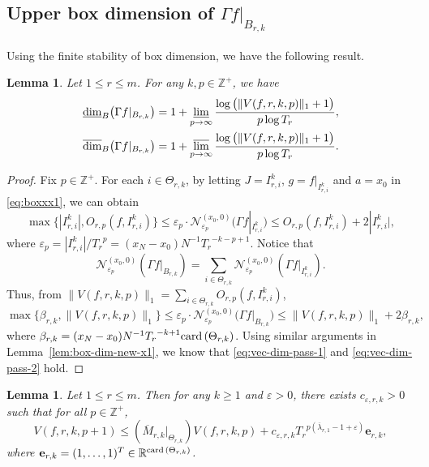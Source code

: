 \documentclass[11pt]{amsart}
\newtheorem{lem}[thm]{Lemma}
\theoremstyle{definition}
\theoremstyle{remark}
\numberwithin{equation}{section}
\newcommand{\Z}{{\mathbb Z}}
\newcommand{\bfe}{{\mathbf e}}
\newcommand{\upM}{{\overline{M}}}
\newcommand{\uplam}{{\overline{\lambda}}}
\def\vep{\varepsilon}
\def\updimB{\overline{\dim}_B}
\def\lowdimB{\underline{\dim}_B}
\newcommand{\card}{{\rm card\,}}
\begin{document}
\subsection{Upper box dimension of $\Gamma f|_{B_{r,k}}$ }



Using the finite stability of box dimension, we have the following result.
\begin{lem}\label{lem:box-def-3}
	Let $1 \leq r \leq m$. For any $k,p \in \mathbb{Z}^+$, we have
	\begin{align}
		\lowdimB \big(\Gamma f|_{B_{r,k}} \big) & = 1+\varliminf_{p \to \infty} \frac{\log \big(\lVert V(f,r,k,p) \rVert_1+1\big)}{p \log T_r}, \label{eq:vec-dim-pass-1}  \\
		\updimB \big(\Gamma f|_{B_{r,k}} \big)
		&= 1+\varlimsup_{p \to \infty} \frac{\log \big(\lVert V(f,r,k,p) \rVert_1+1\big)}{p \log T_r}. \label{eq:vec-dim-pass-2} 
	\end{align}
\end{lem}
\begin{proof}
  Fix $p\in \Z^+$. For each $i\in \Theta_{r,k}$, by letting $J= I_{r,i}^k$, $g=f|_{I_{r,i}^k}$ and $a=x_0$ in \eqref{eq:boxxx1}, we can obtain
	\begin{equation*}%
		\max \big\{ | I_{r,i}^k |, O_{r,p}(f,{I_{r,i}^k})  \big\}
		\leq \vep_{p} \cdot \mathcal{N}_{\vep_{p}}^{(x_0,0)} \big(\Gamma f|_{I_{r,i}^k}\big) 
		\leq     O_{r,p}(f,{I_{r,i}^k}) +2 |{I_{r,i}^k}|,
	\end{equation*}
	where $\vep_{p}=| I_{r,i}^k |/{T_r}^p=(x_N-x_0)N^{-1}{T_r}^{-k-p+1}$.
	Notice that
	\[
	  \mathcal{N}_{\vep_p}^{(x_0,0)} (\Gamma f|_{B_{r,k}}) =\sum_{i \in \Theta_{r,k}}
	  \mathcal{N}_{\vep_p}^{(x_0,0)} (\Gamma f|_{I_{r,i}^k}).
	\]
	Thus, from $\lVert V(f,r,k,p) \rVert_1=\sum_{i \in \Theta_{r,k}} O_{r,p}(f,{I_{r,i}^k})$, 
	\[
    	\max\big\{\beta_{r,k}, \lVert V(f,r,k,p) \rVert_1  \big\}
    	\leq
	    \vep_{p} \cdot\mathcal{N}_{\vep_{p}}^{(x_0,0)} \big(\Gamma f|_{B_{r,k}}\big) 
	    \leq \lVert V(f,r,k,p) \rVert_1+2\beta_{r,k},
	\]
	where $\beta_{r,k}= (x_N-x_0)N^{-1}{T_r}^{-k+1}\card  (\Theta_{r,k})$. 
	Using similar arguments in Lemma~\ref{lem:box-dim-new-x1},
	we know that \eqref{eq:vec-dim-pass-1} and \eqref{eq:vec-dim-pass-2} hold. 
\end{proof}




\begin{lem}\label{lem:vsm-pass-tmp-2}
	Let $1 \leq r \leq m$.  
	Then for any $k\geq 1$ and $\vep>0$, there exists $c_{\vep,r,k}>0$ such that for all $p \in \mathbb{Z}^+$, 
	\begin{equation*}%
		V(f,r,k,p+1) \leq (\upM_{r,k}|_{\Theta_{r,k}}) V(f,r,k,p)+c_{\vep,r,k} {T_r}^ {p (\uplam_{r,1}-1+\vep)} \bfe_{r,k},
	\end{equation*}
	where $\bfe_{r,k} = (1,\ldots,1)^{T} \in \mathbb{R}^{\card (\Theta_{r,k})}$.
\end{lem}
\end{document}
